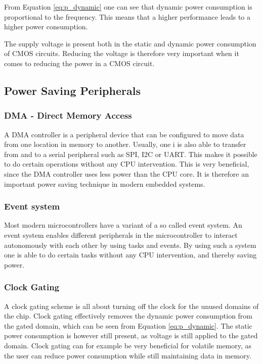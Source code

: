 From Equation \ref{eq:p_dynamic} one can see that dynamic power consumption is proportional to the frequency. This means that a higher performance leads to a higher power consumption.

The supply voltage is present both in the static and dynamic power consumption of CMOS circuits. Reducing the voltage is therefore very important when it comes to reducing the power in a CMOS circuit.

\subsection{Power Saving Peripherals}

\subsubsection{DMA - Direct Memory Access}

A DMA controller is a peripheral device that can be configured to move data from one location in memory to another. Usually, one i is also able to transfer from and to a serial peripheral such as SPI, I2C or UART. This makes it possible to do certain operations without any CPU intervention. This is very beneficial, since the DMA controller uses less power than the CPU core. It is therefore an important power saving technique in modern embedded systems.  

\subsubsection{Event system}

Most modern microcontrollers have a variant of a so called event system. An event system enables different peripherals in the microcontroller to interact autonomously with each other by using tasks and events. By using such a system one is able to do certain tasks without any CPU intervention, and thereby saving power.

\subsubsection{Clock Gating}

A clock gating scheme is all about turning off the clock for the unused domains of the chip. Clock gating effectively removes the dynamic power consumption from the gated domain, which can be seen from Equation \ref{eq:p_dynamic}. The static power consumption is however still present, as voltage is still applied to the gated domain. Clock gating can for example be very beneficial for volatile memory, as the user can reduce power consumption while still maintaining data in memory.


